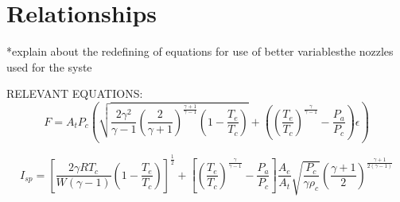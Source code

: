 \section{Relationships}
*explain about the redefining of equations for use of better variablesthe nozzles used for the syste


RELEVANT EQUATIONS:
\begin{equation}\label{eq:RelevantNozzleForce}
F = A_t P_c \left(\sqrt{\frac{2\gamma^2}{\gamma-1}\left(\frac{2}{\gamma+1}\right)^{\frac{\gamma+1}{\gamma-1}}\left(1-\frac{T_e}{T_c}\right)}+\left(\left(\frac{T_e}{T_c}\right)^{\frac{\gamma}{\gamma-1}}-\frac{P_a}{P_c}\right)\epsilon\right)
\end{equation}

\begin{equation}\label{eq:RelevantIsp}
I_{sp}=\left[\frac{2\gamma R T_c}{W(\gamma-1)}\left(1-\frac{T_e}{T_c}\right)\right]^{\frac{1}{2}}+\left[\left(\frac{T_e}{T_c}\right)^{\frac{\gamma}{\gamma-1}}-\frac{P_a}{P_c}\right]\frac{A_e}{A_t}\sqrt{\frac{P_c}{\gamma\rho_c}}\left(\frac{\gamma+1}{2}\right)^{\frac{\gamma+1}{2(\gamma-1)}}
\end{equation} 